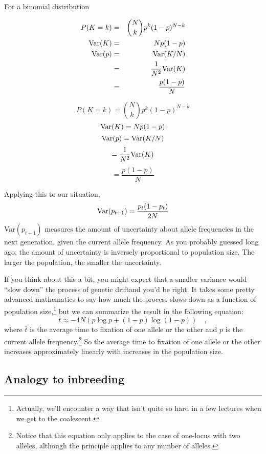 For a binomial distribution
\begin{latexonly}
\begin{eqnarray*}
P(K=k) &=& {{N \choose k}p^k(1-p)^{N-k}} \\
\hbox{Var}(K) &=& Np(1-p) \\
\hbox{Var}(p) &=& \hbox{Var}(K/N) \\
              &=& \frac{1}{N^2}\hbox{Var}(K) \\
              &=& \frac{p(1-p)}{N}
\end{eqnarray*}
\end{latexonly}
\begin{htmlonly}
\[
P(K=k) = {{N \choose k}p^k(1-p)^{N-k}}
\]
\[
\hbox{Var}(K) = Np(1-p)
\]
\[
\hbox{Var}(p) = \hbox{Var}(K/N)
\]
\[
              = \frac{1}{N^2}\hbox{Var}(K)
\]
\[
              = \frac{p(1-p)}{N}
\]
\end{htmlonly}
Applying this to our situation,
\[
\hbox{Var}(p_{t+1}) = \frac{p_t(1-p_t)}{2N}
\]
Var$(p_{t+1})$ measures the amount of uncertainty about allele
frequencies in the next generation, given the current allele
frequency. As you probably guessed long ago, the amount of uncertainty
is inversely proportional to population size. The larger the
population, the smaller the uncertainty.

If you think about this a bit, you might expect that a smaller
variance would ``slow down'' the process of genetic drift{\dash}and
you'd be right. It takes some pretty advanced mathematics to say how
much the process slows down as a function of population
size,\footnote{Actually, we'll encounter a way that isn't quite so
  hard in a few lectures when we get to the coalescent.} but we can
summarize the result in the following equation:
\[
\bar t \approx -4N\left(p\log p + (1-p)\log(1-p)\right) \quad ,
\]
where $\bar t$ is the average time to fixation of one allele or the
other and $p$ is the current allele frequency.\footnote{Notice that
  this equation only applies to the case of one-locus with two
  alleles, although the principle applies to any number of alleles.}
So the average time to fixation of one allele or the other increases
approximately linearly with increases in the population size.

\subsection*{Analogy to inbreeding}

